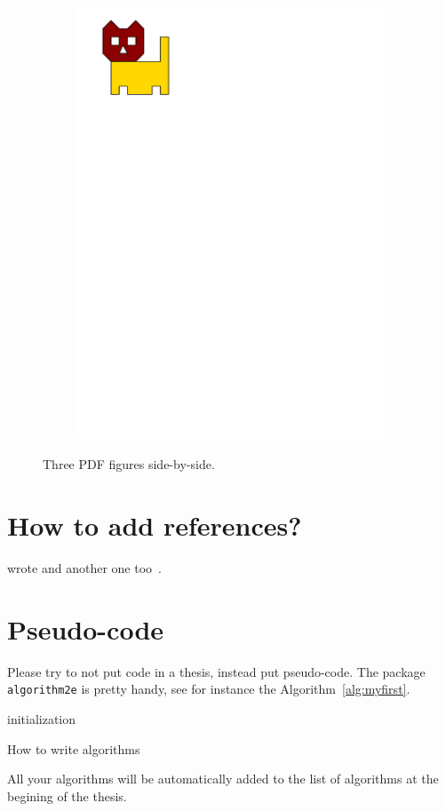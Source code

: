 \begin{figure}
\begin{subfigure}[b]{0.2\linewidth}
    \includegraphics[page=3,width=\linewidth]{figs/tricat.pdf}
    \caption{}\label{fig:pdffig:3}
  \end{subfigure}%
  \caption{Three PDF figures side-by-side.}\label{fig:pdffig}
\end{figure}



\section{How to add references?}

\citet{Descartes37} wrote and another one too~\citep{Voronoi08,Delaunay34}.


\section{Pseudo-code}

Please try to not put code in a thesis, instead put pseudo-code.
The package \texttt{algorithm2e} is pretty handy, see for instance the Algorithm~\ref{alg:myfirst}.
\begin{algorithm}[h]
 initialization\;
 \caption{How to write algorithms}\label{alg:myfirst}
\end{algorithm}
All your algorithms will be automatically added to the list of algorithms at the begining of the thesis.

